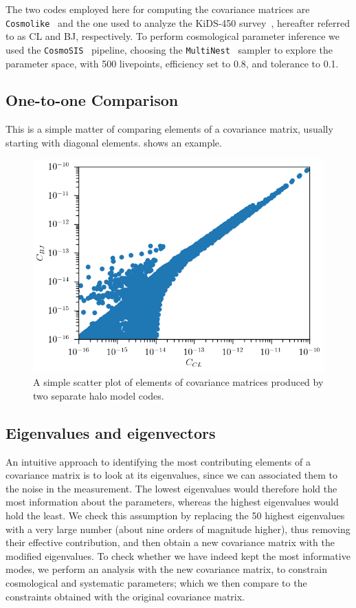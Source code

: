 \documentclass[twocolumn]{\docclass}
\begin{document}
The two codes employed here for computing the covariance matrices are {\tt Cosmolike}~\citep{Krause:2016jvl} and the one used to analyze the KiDS-450 survey~\citep{Kohlinger:2017sxk}, hereafter referred to as CL and BJ, respectively. To perform cosmological parameter inference we used the {\tt CosmoSIS}~\citep{ZUNTZ201545} pipeline, choosing the {\tt MultiNest}~\citep{nested:feroz09} sampler to explore the parameter space, with 500 livepoints, efficiency set to 0.8, and tolerance to 0.1.

\subsection{One-to-one Comparison}

This is a simple matter of comparing elements of a covariance matrix, usually starting with diagonal elements.  shows an example.

\begin{figure}
\includegraphics[width=0.9\columnwidth]{xipmscatter.png}
\caption{A simple scatter plot of elements of covariance matrices produced by two separate halo model codes. \label{fig:xipmscatter}}
\end{figure}


\subsection{Eigenvalues and eigenvectors}

An intuitive approach to identifying the most contributing elements of a covariance matrix is to look at its eigenvalues, since we can associated them to the noise in the measurement. The lowest eigenvalues would therefore hold the most information about the parameters, whereas the highest eigenvalues would hold the least. We check this assumption by replacing the 50 highest eigenvalues with a very large number (about nine orders of magnitude higher), thus removing their effective contribution, and then obtain a new covariance matrix with the modified eigenvalues. To check whether we have indeed kept the most informative modes, we perform an analysis with the new covariance matrix, to constrain cosmological and systematic parameters; which we then compare to the constraints obtained with the original covariance matrix. 
\end{document}
